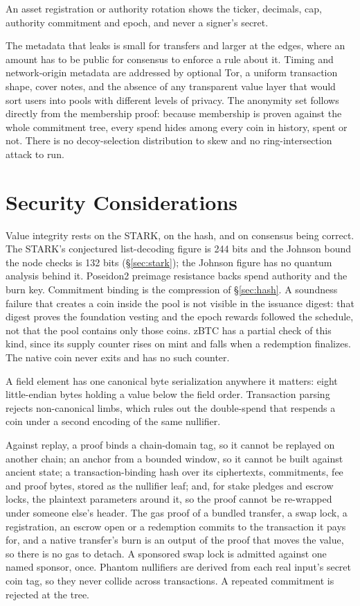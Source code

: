 \documentclass[twocolumn,10pt]{article}
\begin{document}
An asset registration or authority rotation shows the ticker, decimals, cap, authority commitment and epoch, and never a signer's secret.

The metadata that leaks is small for transfers and larger at the edges, where an amount has to be public for consensus to enforce a rule about it. Timing and network-origin metadata are addressed by optional Tor, a uniform transaction shape, cover notes, and the absence of any transparent value layer that would sort users into pools with different levels of privacy. The anonymity set follows directly from the membership proof: because membership is proven against the whole commitment tree, every spend hides among every coin in history, spent or not. There is no decoy-selection distribution to skew and no ring-intersection attack to run.

\section{Security Considerations}
\label{sec:security}

Value integrity rests on the STARK, on the hash, and on consensus being correct. The STARK's conjectured list-decoding figure is 244 bits and the Johnson bound the node checks is 132 bits (\S\ref{sec:stark}); the Johnson figure has no quantum analysis behind it. Poseidon2 preimage resistance backs spend authority and the burn key. Commitment binding is the compression of \S\ref{sec:hash}. A soundness failure that creates a coin inside the pool is not visible in the issuance digest: that digest proves the foundation vesting and the epoch rewards followed the schedule, not that the pool contains only those coins. zBTC has a partial check of this kind, since its supply counter rises on mint and falls when a redemption finalizes. The native coin never exits and has no such counter.

A field element has one canonical byte serialization anywhere it matters: eight little-endian bytes holding a value below the field order. Transaction parsing rejects non-canonical limbs, which rules out the double-spend that respends a coin under a second encoding of the same nullifier.

Against replay, a proof binds a chain-domain tag, so it cannot be replayed on another chain; an anchor from a bounded window, so it cannot be built against ancient state; a transaction-binding hash over its ciphertexts, commitments, fee and proof bytes, stored as the nullifier leaf; and, for stake pledges and escrow locks, the plaintext parameters around it, so the proof cannot be re-wrapped under someone else's header. The gas proof of a bundled transfer, a swap lock, a registration, an escrow open or a redemption commits to the transaction it pays for, and a native transfer's burn is an output of the proof that moves the value, so there is no gas to detach. A sponsored swap lock is admitted against one named sponsor, once. Phantom nullifiers are derived from each real input's secret coin tag, so they never collide across transactions. A repeated commitment is rejected at the tree.
\end{document}
